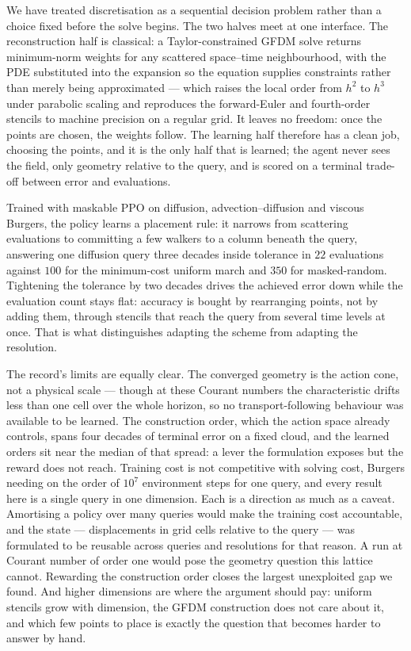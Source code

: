 We have treated discretisation as a sequential decision problem rather than a
choice fixed before the solve begins. The two halves meet at one interface. The
reconstruction half is classical: a Taylor-constrained GFDM solve returns
minimum-norm weights for any scattered space--time neighbourhood, with the PDE
substituted into the expansion so the equation supplies constraints rather than
merely being approximated --- which raises the local order from $h^{2}$ to
$h^{3}$ under parabolic scaling and reproduces the forward-Euler and fourth-order
stencils to machine precision on a regular grid. It leaves no freedom: once the
points are chosen, the weights follow. The learning half therefore has a clean
job, choosing the points, and it is the only half that is learned; the agent
never sees the field, only geometry relative to the query, and is scored on a
terminal trade-off between error and evaluations.

Trained with maskable PPO on diffusion, advection--diffusion and viscous Burgers,
the policy learns a placement rule: it narrows from scattering evaluations to
committing a few walkers to a column beneath the query, answering one diffusion
query three decades inside tolerance in $22$ evaluations against $100$ for the
minimum-cost uniform march and $350$ for masked-random. Tightening the tolerance
by two decades drives the achieved error down while the evaluation count stays
flat: accuracy is bought by rearranging points, not by adding them, through
stencils that reach the query from several time levels at once. That is what
distinguishes adapting the scheme from adapting the resolution.

The record's limits are equally clear. The converged geometry is the action cone,
not a physical scale --- though at these Courant numbers the characteristic
drifts less than one cell over the whole horizon, so no transport-following
behaviour was available to be learned. The construction order, which the action
space already controls, spans four decades of terminal error on a fixed cloud,
and the learned orders sit near the median of that spread: a lever the
formulation exposes but the reward does not reach. Training cost is not
competitive with solving cost, Burgers needing on the order of $10^{7}$
environment steps for one query, and every result here is a single query in one
dimension. Each is a direction as much as a caveat. Amortising a policy over many
queries would make the training cost accountable, and the state --- displacements
in grid cells relative to the query --- was formulated to be reusable across
queries and resolutions for that reason. A run at Courant number of order one
would pose the geometry question this lattice cannot. Rewarding the construction
order closes the largest unexploited gap we found. And higher dimensions are
where the argument should pay: uniform stencils grow with dimension, the GFDM
construction does not care about it, and which few points to place is exactly the
question that becomes harder to answer by hand.
